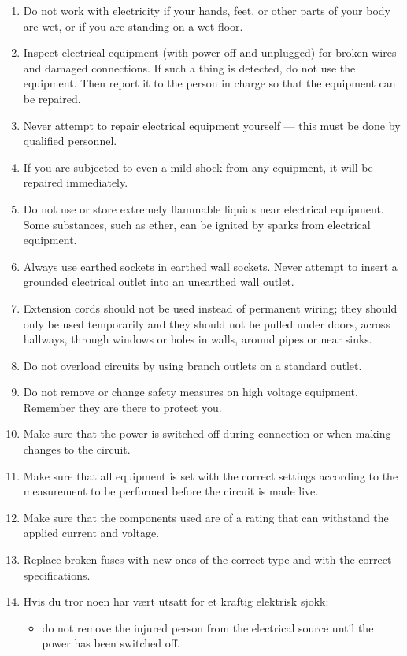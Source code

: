 \documentclass[../Elmag-labhefte-2020.tex]{subfiles}
\begin{document}
\begin{enumerate}
    \item Do not work with electricity if your hands, feet, or other parts of your body are wet, or if you are standing on a wet floor.
    \item Inspect electrical equipment (with power off and unplugged) for broken wires and damaged connections. If such a thing is detected, do not use the equipment. Then report it to the person in charge so that the equipment can be repaired.
    \item Never attempt to repair electrical equipment yourself --- this must be done by qualified personnel.
    \item If you are subjected to even a mild shock from any equipment, it will be repaired immediately.
    \item Do not use or store extremely flammable liquids near electrical equipment. Some substances, such as ether, can be ignited by sparks from electrical equipment.
    \item Always use earthed sockets in earthed wall sockets. Never attempt to insert a grounded electrical outlet into an unearthed wall outlet.
    \item Extension cords should not be used instead of permanent wiring; they should only be used temporarily and they should not be pulled under doors, across hallways, through windows or holes in walls, around pipes or near sinks.
    \item Do not overload circuits by using branch outlets on a standard outlet.
    \item Do not remove or change safety measures on high voltage equipment. Remember they are there to protect you.
    \item Make sure that the power is switched off during connection or when making changes to the circuit.
    \item Make sure that all equipment is set with the correct settings according to the measurement to be performed before the circuit is made live.
    \item Make sure that the components used are of a rating that can withstand the applied current and voltage.
    \item Replace broken fuses with new ones of the correct type and with the correct specifications.
    \item {\itsf Hvis du tror noen har vært utsatt for et kraftig elektrisk sjokk\/}:
    \begin{itemize}
        \item do not remove the injured person from the electrical source until the power has been switched off.

\end{itemize}
\end{enumerate}
\end{document}
